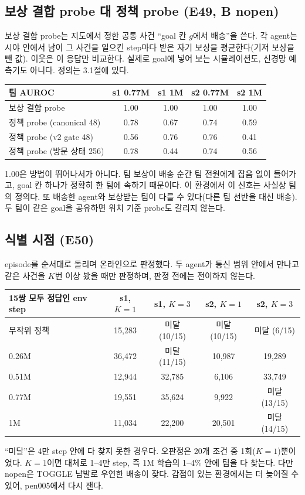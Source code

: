 \documentclass[11pt]{article}
\begin{document}
\subsection{보상 결합 probe 대 정책 probe (E49, B nopen)}
보상 결합 probe는 지도에서 정한 공통 사건 ``goal 칸 $g$에서 배송''을 쓴다. 각 agent는 시야 안에서 남이 그 사건을 일으킨 step마다 받은 자기 보상을 평균한다(기저 보상을 뺀 값). 이웃은 이 응답만 비교한다. 실제로 goal에 넣어 보는 시뮬레이션도, 신경망 예측기도 아니다. 정의는 3.1절에 있다.
\begin{center}
\begin{tabular}{lcccc}
\toprule
팀 AUROC & s1 0.77M & s1 1M & s2 0.77M & s2 1M \\
\midrule
보상 결합 probe & 1.00 & 1.00 & 1.00 & 1.00 \\
정책 probe (canonical 48) & 0.78 & 0.67 & 0.74 & 0.59 \\
정책 probe (v2 gate 48) & 0.56 & 0.76 & 0.76 & 0.41 \\
정책 probe (방문 상태 256) & 0.78 & 0.44 & 0.74 & 0.56 \\
\bottomrule
\end{tabular}
\end{center}
1.00은 방법이 뛰어나서가 아니다. 팀 보상이 배송 순간 팀 전원에게 잡음 없이 들어가고, goal 칸 하나가 정확히 한 팀에 속하기 때문이다. 이 환경에서 이 신호는 사실상 팀의 정의다.
또 배송한 agent와 보상받는 팀이 다를 수 있다(다른 팀 선반을 대신 배송). 두 팀이 같은 goal을 공유하면 위치 기준 probe도 갈리지 않는다.

\subsection{식별 시점 (E50)}
episode를 순서대로 돌리며 온라인으로 판정했다. 두 agent가 통신 범위 안에서 만나고 같은 사건을 $K$번 이상 봤을 때만 판정하며, 판정 전에는 전이하지 않는다.
\begin{center}
\begin{tabular}{lcccc}
\toprule
15쌍 모두 정답인 env step & s1, $K{=}1$ & s1, $K{=}3$ & s2, $K{=}1$ & s2, $K{=}3$ \\
\midrule
무작위 정책 & 15,283 & 미달 (10/15) & 미달 (10/15) & 미달 (6/15) \\
0.26M & 36,472 & 미달 (11/15) & 10,987 & 19,289 \\
0.51M & 12,944 & 32,785 & 6,106 & 33,749 \\
0.77M & 19,551 & 35,624 & 9,922 & 미달 (13/15) \\
1M & 11,034 & 22,200 & 20,501 & 미달 (14/15) \\
\bottomrule
\end{tabular}
\end{center}
``미달''은 4만 step 안에 다 찾지 못한 경우다. 오판정은 20개 조건 중 1회($K{=}1$)뿐이었다. $K{=}1$이면 대체로 1--4만 step, 즉 1M 학습의 1--4\% 안에 팀을 다 찾는다.
다만 nopen은 TOGGLE 남발로 우연한 배송이 잦다. 감점이 있는 환경에서는 더 늦어질 수 있어, pen005에서 다시 잰다.
\end{document}
